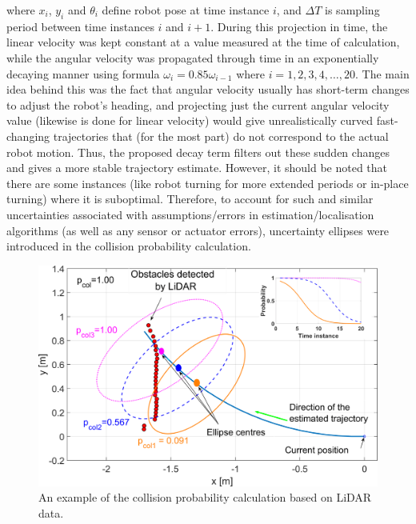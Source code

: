where $x_i$, $y_i$ and $\theta_i$ define robot pose at time instance $i$, and $\Delta T$ is sampling period between time instances $i$ and $i+1$. During this projection in time, the linear velocity was kept constant at a value measured at the time of calculation, while the angular velocity was propagated through time in an exponentially decaying manner using formula $\omega_i=0.85\omega_{i-1}$ where $i=1,2,3,4,\ldots,20$. The main idea behind this was the fact that angular velocity usually has short-term changes to adjust the robot's heading, and projecting just the current angular velocity value (likewise is done for linear velocity) would give unrealistically curved fast-changing trajectories that (for the most part) do not correspond to the actual robot motion. Thus, the proposed decay term filters out these sudden changes and gives a more stable trajectory estimate. However, it should be noted that there are some instances (like robot turning for more extended periods or in-place turning) where it is suboptimal. Therefore, to account for such and similar uncertainties associated with assumptions/errors in estimation/localisation algorithms (as well as any sensor or actuator errors), uncertainty ellipses were introduced in the collision probability calculation.

\begin{figure}
    \centering
    \includegraphics[width=\columnwidth]{slike/col_prob.png}
    \caption{An example of the collision probability calculation based on LiDAR data.}
    \label{Fig:Elipse2}
\end{figure}

